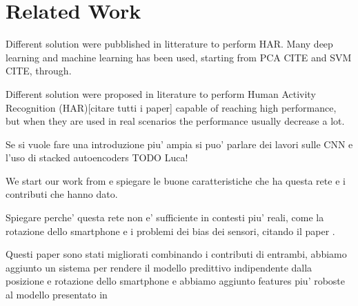 
\section{Related Work}
\label{sec:related_work}

Different solution were pubblished in litterature to perform HAR. Many deep learning and machine learning has been used, starting from PCA CITE and SVM CITE, through.

Different solution were proposed in literature to perform Human Activity Recognition (HAR)[citare tutti i paper] capable of reaching high performance, but when they are used in real scenarios the performance usually decrease a lot.

Se si vuole fare una introduzione piu' ampia si puo' parlare dei lavori sulle CNN e l'uso di stacked autoencoders TODO Luca!

We start our work from \cite{ignatov2018real} e spiegare le buone caratteristiche che ha questa rete e i contributi che hanno dato.

Spiegare perche' questa rete non e' sufficiente in contesti piu' reali, come la rotazione dello smartphone e i problemi dei bias dei sensori, citando il paper \cite{stisen2015smart}.

Questi paper sono stati migliorati combinando i contributi di entrambi, abbiamo aggiunto un sistema per rendere il modello predittivo indipendente dalla posizione e rotazione dello smartphone e abbiamo aggiunto features piu' roboste al modello presentato in \cite{ignatov2018real}



